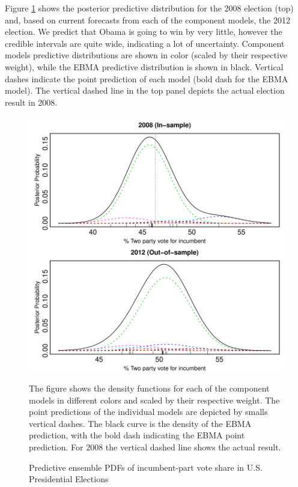 \documentclass[12pt,fullpage,endnotes]{article}
\begin{document}
Figure \ref{pres} shows the posterior predictive distribution for the
2008 election (top) and, based on current forecasts from each of the
component models, the 2012 election.  We predict that Obama is going to
win by very little, however the credible intervals are quite wide,
indicating a lot of uncertainty. Component models predictive
distributions are shown in color (scaled by their respective weight),
while the EBMA predictive distribution is shown in black. Vertical
dashes indicate the point prediction of each model (bold dash for the
EBMA model). The vertical dashed line in the top panel depicts the
actual election result in 2008.

\begin{figure}[h]
\caption{Predictive ensemble PDFs of incumbent-part vote share in U.S. Presidential Elections}
\label{pres}
\begin{center}
\includegraphics[scale=.8]{presForecast}
\end{center}
The figure shows the density functions for each of the component
models in different colors and scaled by their respective weight. The
point predictions of the individual models are depicted by smalls
vertical dashes. The black curve is the density of the EBMA
prediction, with the bold dash indicating the EBMA point
prediction. For 2008 the vertical dashed line shows the actual result.
\end{figure}
\end{document}
